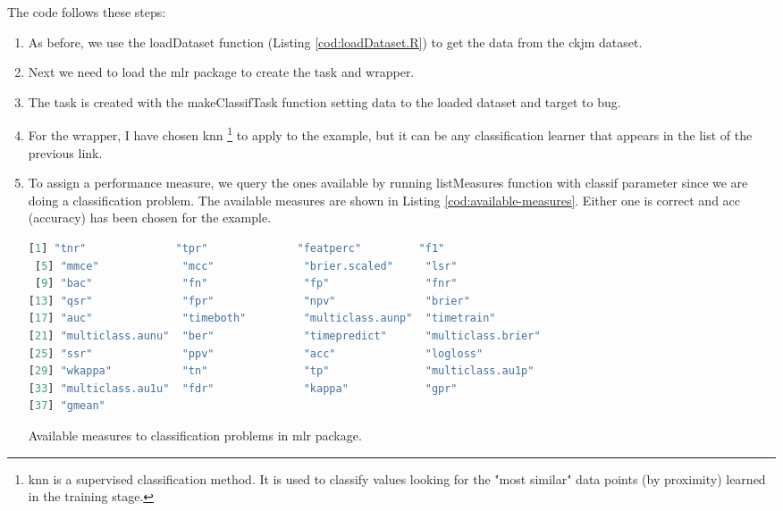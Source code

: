The code follows these steps:

\begin{enumerate}
    \item As before, we use the loadDataset function (Listing \ref{cod:loadDataset.R}) to get the data from the ckjm dataset.
    
    \item Next we need to load the mlr package to create the task and wrapper.
    
    \item The task is created with the makeClassifTask function setting data to the loaded dataset and target to bug.
    
    \item For the wrapper, I have chosen \acrfull{knn} \footnote{\acrlong{knn} is a supervised classification method. It is used to classify values looking for the "most similar" data points (by proximity) learned in the training stage.} to apply to the example, but it can be any classification learner that appears in the list of the previous link.
    
    \item To assign a performance measure, we query the ones available by running listMeasures function with classif parameter since we are doing a classification problem. The available measures are shown in Listing \ref{cod:available-measures}. Either one is correct and acc (accuracy) has been chosen for the example.

\begin{codefloat}[H]
\begin{lstlisting}[language=R, style=console]
 [1] "tnr"              "tpr"              "featperc"         "f1"              
 [5] "mmce"             "mcc"              "brier.scaled"     "lsr"             
 [9] "bac"              "fn"               "fp"               "fnr"             
[13] "qsr"              "fpr"              "npv"              "brier"           
[17] "auc"              "timeboth"         "multiclass.aunp"  "timetrain"       
[21] "multiclass.aunu"  "ber"              "timepredict"      "multiclass.brier"
[25] "ssr"              "ppv"              "acc"              "logloss"         
[29] "wkappa"           "tn"               "tp"               "multiclass.au1p" 
[33] "multiclass.au1u"  "fdr"              "kappa"            "gpr"             
[37] "gmean"  
\end{lstlisting}
\caption{Available measures to classification problems in mlr package.}
\label{cod:available-measures}
\end{codefloat}


\end{enumerate}
